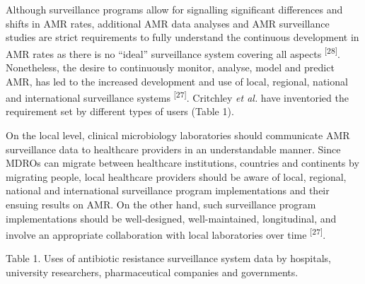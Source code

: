 \documentclass[
]{book}
\begin{document}
Although surveillance programs allow for signalling significant differences and shifts in AMR rates, additional AMR data analyses and AMR surveillance studies are strict requirements to fully understand the continuous development in AMR rates as there is no ``ideal'' surveillance system covering all aspects \textsuperscript{{[}28{]}}. Nonetheless, the desire to continuously monitor, analyse, model and predict AMR, has led to the increased development and use of local, regional, national and international surveillance systems \textsuperscript{{[}27{]}}. Critchley \emph{et al.} have inventoried the requirement set by different types of users (Table 1).

On the local level, clinical microbiology laboratories should communicate AMR surveillance data to healthcare providers in an understandable manner. Since MDROs can migrate between healthcare institutions, countries and continents by migrating people, local healthcare providers should be aware of local, regional, national and international surveillance program implementations and their ensuing results on AMR. On the other hand, such surveillance program implementations should be well-designed, well-maintained, longitudinal, and involve an appropriate collaboration with local laboratories over time \textsuperscript{{[}27{]}}.

Table 1. Uses of antibiotic resistance surveillance system data by hospitals, university researchers, pharmaceutical companies and governments.
\end{document}
